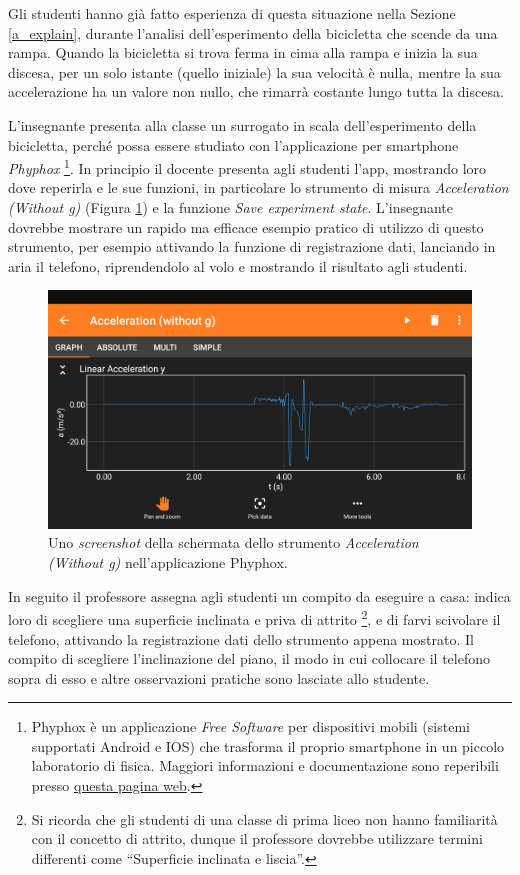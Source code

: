 \documentclass{report} \usepackage[T1]{fontenc} \usepackage[italian]{babel}
\begin{document}
Gli studenti hanno già fatto esperienza di questa situazione nella Sezione
\ref{a_explain}, durante l'analisi dell'esperimento della bicicletta che
scende da una rampa. Quando la bicicletta si trova ferma in cima alla rampa
e inizia la sua discesa, per un solo istante (quello iniziale) la sua velocità
è nulla, mentre la sua accelerazione ha un valore non nullo, che rimarrà costante
lungo tutta la discesa.

L'insegnante presenta alla classe un surrogato in scala dell'esperimento della
bicicletta, perché possa essere studiato con l'applicazione per smartphone
\emph{Phyphox}
\footnote{
          Phyphox è un applicazione \emph{Free Software} per dispositivi mobili
          (sistemi supportati Android e IOS) che trasforma il proprio
          smartphone in un piccolo laboratorio di fisica. Maggiori
          informazioni e documentazione sono reperibili presso
          \textcolor{blue}{\href{https://phyphox.org/}{questa pagina web}}.
         }.
In principio il docente presenta agli studenti l'app, mostrando loro dove
reperirla e le sue funzioni, in particolare lo strumento di misura
\emph{Acceleration (Without g)} (Figura \ref{fig:phyphox}) e la funzione
\emph{Save experiment state}.
L'insegnante dovrebbe mostrare un rapido ma efficace esempio pratico
di utilizzo di questo strumento, per esempio attivando la funzione
di registrazione dati, lanciando in aria il telefono, riprendendolo
al volo e mostrando il risultato agli studenti.
\begin{figure}[H]
\centering
  \includegraphics[width=\textwidth]{phyphox}
  \caption{Uno \emph{screenshot} della schermata dello strumento
           \emph{Acceleration (Without g)}
           nell'applicazione Phyphox.}
  \label{fig:phyphox}
\end{figure}
In seguito il professore assegna agli studenti un compito da eseguire
a casa: indica loro di scegliere una superficie inclinata
e priva di attrito
\footnote{
          Si ricorda che gli studenti di una classe di prima liceo
          non hanno familiarità con il concetto di attrito,
          dunque il professore dovrebbe utilizzare termini differenti
          come ``Superficie inclinata e liscia''.
         },
e di farvi scivolare il telefono, attivando
la registrazione dati dello strumento appena mostrato.
Il compito di scegliere l'inclinazione del piano, il modo in cui
collocare il telefono sopra di esso e altre osservazioni pratiche
sono lasciate allo studente.
\end{document}
